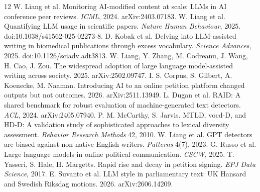 \documentclass[10pt,twocolumn]{article}
\begin{document}
\begin{thebibliography}{12}\footnotesize
{} W. Liang et al. Monitoring AI-modified content at scale: LLMs in AI conference peer reviews. \emph{ICML}, 2024. arXiv:2403.07183.
 W. Liang et al. Quantifying LLM usage in scientific papers. \emph{Nature Human Behaviour}, 2025. doi:10.1038/s41562-025-02273-8.
 D. Kobak et al. Delving into LLM-assisted writing in biomedical publications through excess vocabulary. \emph{Science Advances}, 2025. doi:10.1126/sciadv.adt3813.
 W. Liang, Y. Zhang, M. Codreanu, J. Wang, H. Cao, J. Zou. The widespread adoption of large language model-assisted writing across society. 2025. arXiv:2502.09747.
 I. S. Corpus, S. Gilbert, A. Koenecke, M. Naaman. Introducing AI to an online petition platform changed outputs but not outcomes. 2026. arXiv:2511.13949.
 L. Dugan et al. RAID: A shared benchmark for robust evaluation of machine-generated text detectors. \emph{ACL}, 2024. arXiv:2405.07940.
 P. M. McCarthy, S. Jarvis. MTLD, vocd-D, and HD-D: A validation study of sophisticated approaches to lexical diversity assessment. \emph{Behavior Research Methods} 42, 2010.
 W. Liang et al. GPT detectors are biased against non-native English writers. \emph{Patterns} 4(7), 2023.
 G. Russo et al. Large language models in online political communication. \emph{CSCW}, 2025.
 T. Yasseri, S. Hale, H. Margetts. Rapid rise and decay in petition signing. \emph{EPJ Data Science}, 2017.
 E. Suvanto et al. LLM style in parliamentary text: UK Hansard and Swedish Riksdag motions. 2026. arXiv:2606.14209.
\end{thebibliography}
\end{document}

